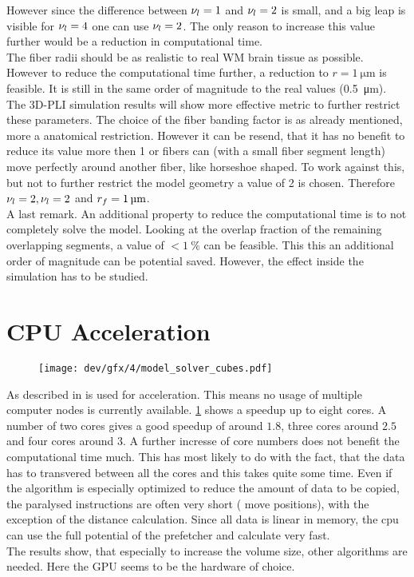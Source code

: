 However since the difference between $\textnormal{$\nu_{l}$}=\SI{1}{}$ and $\textnormal{$\nu_{l}$}=\SI{2}{}$ is small, and a big leap is visible for $\textnormal{$\nu_{l}$}=\SI{4}{}$ one can use $\textnormal{$\nu_{l}$}=\SI{2}{}$.
The only reason to increase this value further would be a reduction in computational time.
\\
% 
The fiber radii should be as realistic to real \acs{WM} brain tissue as possible.
However to reduce the computational time further, a reduction to $r = \SI{1}{\micro\meter}$ is feasible.
It is still in the same order of magnitude to the real values (\SI{0.5}{\micro\meter}).
The \ac{3D-PLI} simulation results will show more effective metric to further restrict these parameters.
% 
The choice of the fiber banding factor is as already mentioned, more a anatomical restriction.
However it can be resend, that it has no benefit to reduce its value more then 1 or fibers can (with a small fiber segment length) move perfectly around another fiber, like horseshoe shaped.
To work against this, but not to further restrict the model geometry a value of 2 is chosen.
Therefore $\textnormal{$\nu_{l}$} = \SI{2}{}, \textnormal{$\nu_{l}$}=\SI{2}{}$ and $\fiberRadius=\SI{1}{\micro\meter}$.
\\
% 
A last remark.
An additional property to reduce the computational time is to not completely solve the model. 
Looking at the overlap fraction of the remaining overlapping segments, a value of $<\SI{1}{\percent}$ can be feasible.
This this an additional order of magnitude can be potential saved.
However, the effect inside the simulation has to be studied.
% 
\section{CPU Acceleration}
% 
\begin{figure}[!t]
\centering
\texttt{[image: dev/gfx/4/model\_solver\_cubes.pdf]}
\caption[speedup]{ }
\label{fig:solverSpeedup}
\end{figure}
% 
% 
As described in \dummy{} \openmp{} is used for acceleration.
This means no usage of multiple computer nodes is currently available.
\cref{fig:solverSpeedup} shows a speedup up to eight cores.
A number of two cores gives a good speedup of around $1.8$, three cores around $2.5$ and four cores around $3$.
A further incresse of core numbers does not benefit the computational time much.
This has most likely to do with the fact, that the data has to transvered between all the cores and this takes quite some time.
Even if the algorithm is especially optimized to reduce the amount of data to be copied, the paralysed instructions are often very short (\eg{} move positions), with the exception of the distance calculation.
Since all data is linear in memory, the cpu can use the full potential of the prefetcher and calculate very fast.
\\[\baselineskip]
% 
The results show, that especially to increase the volume size, other algorithms are needed. 
Here the \ac{GPU} seems to be the hardware of choice.
% 
